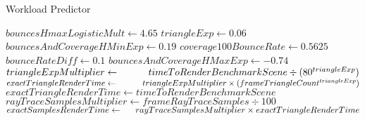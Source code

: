 ﻿\documentclass{article}
\begin{document}
    \begin{algorithm}
        \caption{Workload Predictor}\label{alg:cap}
        \begin{algorithmic}[1]
            \State $bouncesHmaxLogisticMult \gets 4.65$
            \State $triangleExp \gets 0.06$
            \State $bouncesAndCoverageHMinExp \gets 0.19$
            \State $coverage100BounceRate \gets 0.5625$
            \State $bounceRateDiff \gets 0.1$
            \State $bouncesAndCoverageHMaxExp \gets -0.74$
            \newline
                \State $triangleExpMultiplier \gets \newline \indent \indent timeToRenderBenchmarkScene \div (80 ^ {triangleExp})$
                \State $exactTriangleRenderTime \gets \newline \indent \indent triangleExpMultiplier \times (frameTriangleCount ^ {triangleExp})$
            \Else
                \State $exactTriangleRenderTime \gets timeToRenderBenchmarkScene$
            \EndIf
            \newline
            \State $rayTraceSamplesMultiplier \gets frameRayTraceSamples \div 100$
            \State $exactSamplesRenderTime \gets \newline \indent rayTraceSamplesMultiplier \times exactTriangleRenderTime$
        \end{algorithmic}
    \end{algorithm}
\end{document}
